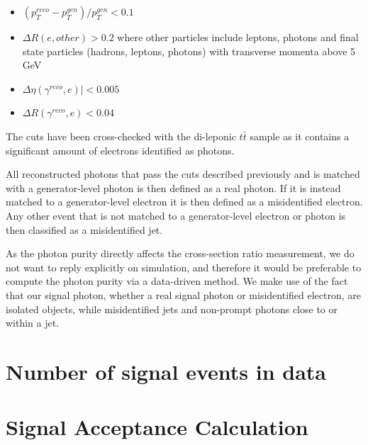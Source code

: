 \begin{itemize}
	\item $\left( p_T^{reco} - p_T^{gen} \right) /p_T^{gen} < 0.1$
	\item $\Delta R ( e, other ) > 0.2$ where other particles include leptons, photons and final state
		  particles (hadrons, leptons, photons) with transverse momenta above 5 GeV
	\item $ \Delta\eta ( \gamma^{reco}, e )| < 0.005$
	\item $\Delta R ( \gamma^{reco}, e ) < 0.04$
\end{itemize}

The cuts have been cross-checked with the di-leponic $t\bar{t}$ sample as it contains a significant amount of electrons identified as photons.

All reconstructed photons that pass the cuts described previously and is matched with a generator-level photon is then defined as a real photon. If it is instead matched to a generator-level electron it is then defined as a misidentified electron. Any other event that is not matched to a generator-level electron or photon is then classified as a misidentified jet.

As the photon purity directly affects the cross-section ratio measurement, we do not want to reply explicitly on simulation, and therefore it would be preferable to compute the photon purity via a data-driven method. We make use of the fact that our signal photon, whether a real signal photon or misidentified electron, are isolated objects, while misidentified jets and non-prompt photons close to or within a jet. 


\cite{PhysRevD.89.092005}

\section{Number of signal events in data} \label{sec-SigEventsData}

\section{Signal Acceptance Calculation} \label{subsec-SignalAcceptanceCalculation}

